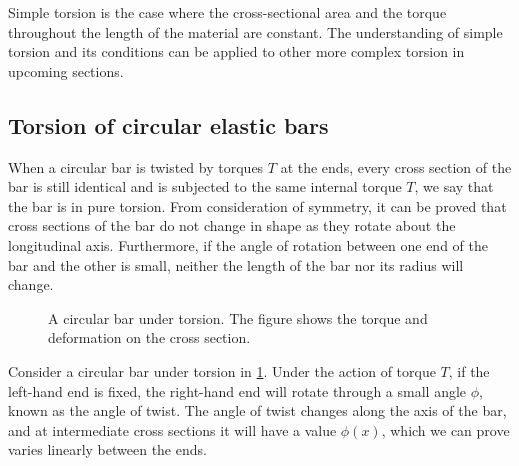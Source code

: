 \documentclass[
10pt,
a4paper,
openany,
svgnames,
]{book} %
\begin{document}
Simple torsion is the case where the cross-sectional area and the torque throughout the length of the material are constant. The understanding of simple torsion and its conditions can be applied to other more complex torsion in upcoming sections.

\subsection{Torsion of circular elastic bars}

When a circular bar is twisted by torques $T$ at the ends, every cross section of the bar is still identical and is subjected to the same internal torque $T$, we say that the bar is in pure torsion. From consideration of symmetry, it can be proved that cross sections of the bar do not change in shape as they rotate about the longitudinal axis. Furthermore, if the angle of rotation between one end of the bar and the other is small, neither the length of the bar nor its radius will change.

\begin{figure}[h]
  \centering
  \caption{A circular bar under torsion. The figure shows the torque and deformation on the cross section.}
  \label{fig: 3d torsional deformation}
\end{figure}

Consider a circular bar under torsion in \cref{fig: 3d torsional deformation}. Under the action of torque $T$, if the left-hand end is fixed, the right-hand end will rotate through a small angle $\phi$, known as the angle of twist. The angle of twist changes along the axis of the bar, and at intermediate cross sections it will have a value $\phi(x)$, which we can prove varies linearly between the ends.
\end{document}
